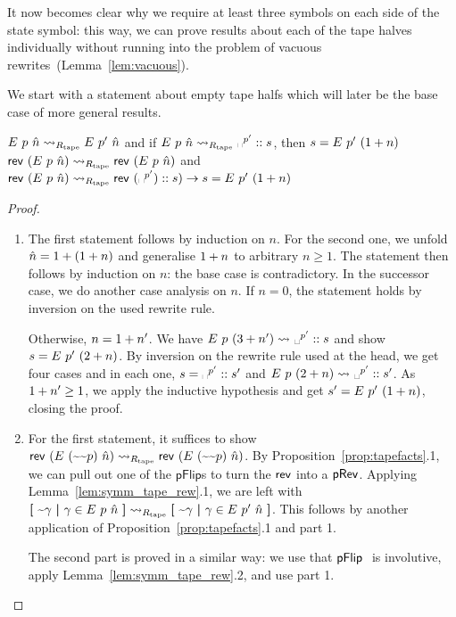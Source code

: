 \begin{remark}
  It now becomes clear why we require at least three symbols on each side of the state symbol: this way, we can prove results about each of the tape halves individually without running into the problem of vacuous rewrites~(Lemma~\ref{lem:vacuous}). 
\end{remark}

We start with a statement about empty tape halfs which will later be the base case of more general results.
\begin{lemma}\label{lem:nilstr_blank}\leavevmode
  \begin{enumerate}
     $E~p~\hat{n} \rightsquigarrow_{R_{\text{tape}}} E~p'~\hat{n}$ and if $\nilstr{p}{\hat{n}} \strent{\Rtape} \blank^{p'} :: s$, then $s = E~p'~(1 +{n})$
     $\mathsf{rev}~{(E~p~\hat{n})} \rightsquigarrow_{R_{\text{tape}}} \mathsf{rev}~{(E~p~\hat{n})}$ and $\rev~{(\nilstr{p}{\hat{n}})} \strent{\Rtape} \rev~{(\blank^{p'}) :: s)} \rightarrow s = \nilstr{p'}{(\natS{n})}$
  \end{enumerate}
\end{lemma}
\begin{proof}\leavevmode
  \begin{enumerate}
    \item The first statement follows by induction on $n$. For the second one, we unfold $\hat{n} = 1 +{(1 +{n})}$ and generalise $1 +{n}$ to arbitrary $n \ge 1$. The statement then follows by induction on $n$: the base case is contradictory. In the successor case, we do another case analysis on $n$. If $n =0$, the statement holds by inversion on the used rewrite rule. 
      
      Otherwise, $n = 1 +{n'}$. 
      We have $\nilstr{p}{(3+n')} \strent{} \blank^{p'} :: s$ and show $s = E~p'~(2 + n)$. By inversion on the rewrite rule used at the head, we get four cases and in each one, $s = \blank^{p'} :: s'$ and $\nilstr{p}{(2+n)} \strent{} \blank^{p'} :: s'$. As $1 +{n'} \ge 1$, we apply the inductive hypothesis and get $s' = E~p'~(1 +{n})$, closing the proof. 
    \item For the first statement, it suffices to show $\mathsf{rev}~{(E~(\text{\textasciitilde}\text{\textasciitilde}p)~\hat{n})} \rightsquigarrow_{R_{\text{tape}}} \mathsf{rev}~{(E~(\text{\textasciitilde}\text{\textasciitilde}p)~\hat{n})}$. By Proposition~\ref{prop:tapefacts}.1, we can pull out one of the $\textsf{pFlip}$s to turn the $\mathsf{rev}$ into a $\textsf{pRev}$. Applying Lemma~\ref{lem:symm_tape_rew}.1, we are left with $\textbf{[}~ \text{\textasciitilde}\gamma ~\textbf{|}~ \gamma \in E~p~\hat{n} ~\textbf{]} \rightsquigarrow_{R_{\text{tape}}} \textbf{[}~ \text{\textasciitilde}\gamma ~\textbf{|}~ \gamma \in E~p'~\hat{n} ~\textbf{]}$. This follows by another application of Proposition~\ref{prop:tapefacts}.1 and part 1. 

      The second part is proved in a similar way: we use that $\pFlip$ is involutive, apply Lemma~\ref{lem:symm_tape_rew}.2, and use part 1.
  \end{enumerate}
\end{proof}

